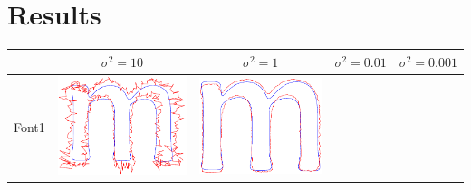 \documentclass[12pt]{article}
\begin{document}
\section{Results}


\begin{center}
\begin{tabular}{|c|c|c|c|c|}
\hline
 & $\sigma^2=10$ & $\sigma^2=1$ & $\sigma^2=0.01$ & $\sigma^2=0.001$ \\ \hline
 Font1 & 
\includegraphics[scale = 0.2]{images/f1var10} &
\includegraphics[scale = 0.2]{images/f1var1} &

\end{tabular}
\end{center}
\end{document}
